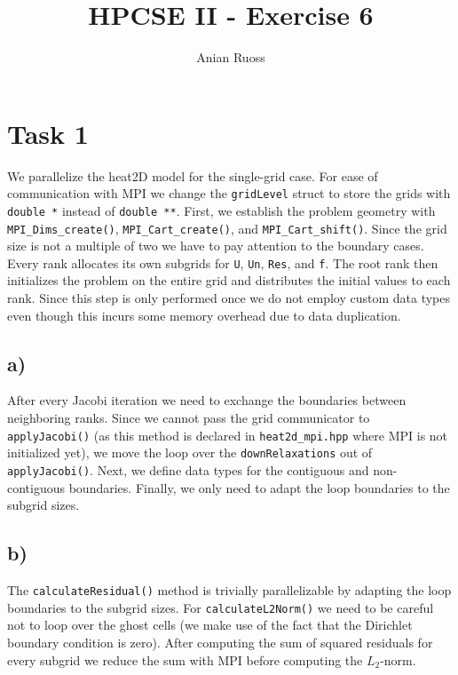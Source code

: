 \documentclass[11pt]{article}
\begin{document}
    \title{HPCSE II - Exercise 6}
    \author{Anian Ruoss}
    \maketitle

    \section*{Task 1}
    \label{sec:Task1}

    We parallelize the heat2D model for the single-grid case.
    For ease of communication with MPI we change the \lstinline{gridLevel}
    struct to store the grids with \lstinline{double *} instead of
    \lstinline{double **}.
    First, we establish the problem geometry with
    \lstinline{MPI_Dims_create()}, \lstinline{MPI_Cart_create()}, and
    \lstinline{MPI_Cart_shift()}.
    Since the grid size is not a multiple of two we have to pay attention to
    the boundary cases.
    Every rank allocates its own subgrids for \lstinline{U}, \lstinline{Un},
    \lstinline{Res}, and \lstinline{f}.
    The root rank then initializes the problem on the entire grid and
    distributes the initial values to each rank.
    Since this step is only performed once we do not employ custom data
    types even though this incurs some memory overhead due to data duplication.

    \subsection*{a)}
    \label{subsec:Task1a}

    After every Jacobi iteration we need to exchange the boundaries between
    neighboring ranks.
    Since we cannot pass the grid communicator to \lstinline{applyJacobi()}
    (as this method is declared in \lstinline{heat2d_mpi.hpp} where MPI is
    not initialized yet), we move the loop over the
    \lstinline{downRelaxations} out of \lstinline{applyJacobi()}.
    Next, we define data types for the contiguous and non-contiguous
    boundaries.
    Finally, we only need to adapt the loop boundaries to the subgrid sizes.

    \subsection*{b)}
    \label{subsec:Task1b}

    The \lstinline{calculateResidual()} method is trivially parallelizable
    by adapting the loop boundaries to the subgrid sizes.
    For \lstinline{calculateL2Norm()} we need to be careful not to loop over
    the ghost cells (we make use of the fact that the Dirichlet boundary
    condition is zero).
    After computing the sum of squared residuals for every subgrid we reduce
    the sum with MPI before computing the $L_2$-norm.
\end{document}

